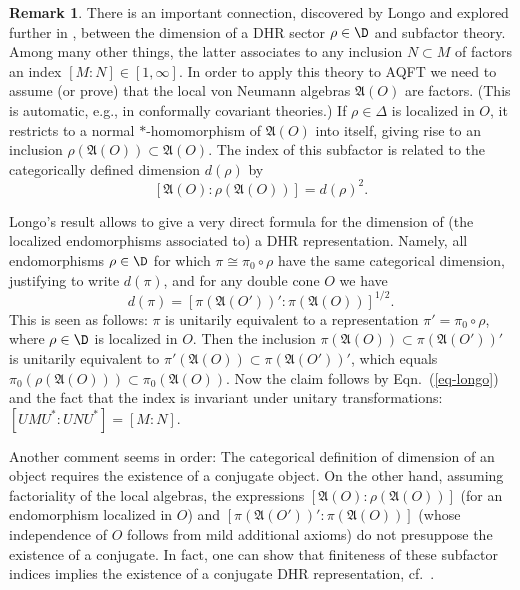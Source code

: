 \documentclass[11pt]{article}
\newcommand{\alg}[1]{\mathfrak{#1}}
\theoremstyle{definition}
\theoremstyle{definition}
\newtheorem{note}[thm]{Remark}
\theoremstyle{remark}
\begin{document}
\begin{note} \label{note-longo}
There is an important connection, discovered by Longo \cite{longo} and explored further in
\cite{LR},  between the dimension of a DHR sector $\rho\in\D$ and subfactor theory. Among many other
things, the latter associates  to any inclusion $N\subset M$ of factors an index
$[M:N]\in[1,\infty]$. In order to apply this theory to AQFT we need  to assume (or prove) that the
local von Neumann algebras $\alg{A}(O)$ are factors. (This is automatic, e.g., in conformally
covariant theories.) If $\rho\in\Delta$ is localized in $O$, it restricts to a normal
$*$-homomorphism  of $\alg{A}(O)$ into itself, giving rise to an inclusion
$\rho(\alg{A}(O))\subset\alg{A}(O)$. The index of this subfactor is related to the categorically
defined dimension $d(\rho)$ by  
\begin{equation}\label{eq-longo} [\alg{A}(O):\rho(\alg{A}(O))]=d(\rho)^2. \end{equation} 

Longo's result allows to give a very direct formula for the dimension of (the localized
endomorphisms associated to) a DHR representation. Namely, all endomorphisms $\rho\in\D$ for which
$\pi\cong\pi_0\circ\rho$ have the same categorical dimension, justifying to write $d(\pi)$, and for
any double cone $O$ we have 
\[ d(\pi)=[\pi(\alg{A}(O'))':\pi(\alg{A}(O))]^{1/2}. \]
This is seen as follows: $\pi$ is unitarily equivalent
to a representation $\pi'=\pi_0\circ\rho$, where
$\rho\in\D$ is localized in $O$. Then the inclusion
$\pi(\alg{A}(O))\subset\pi(\alg{A}(O'))'$ is unitarily
equivalent to
$\pi'(\alg{A}(O))\subset\pi(\alg{A}(O'))'$, which
equals
$\pi_0(\rho(\alg{A}(O)))\subset\pi_0(\alg{A}(O))$. Now
the claim follows by Eqn.\ (\ref{eq-longo}) and the
fact that the index is invariant under unitary
transformations: $[UMU^*:UNU^*]=[M:N]$.

Another comment seems in order: The categorical
definition of dimension of an object requires the
existence of a conjugate object. On the other hand,
assuming factoriality of the local algebras, the
expressions $[\alg{A}(O):\rho(\alg{A}(O))]$ (for an
endomorphism localized in $O$) and
$[\pi(\alg{A}(O'))':\pi(\alg{A}(O))]$ (whose
independence of $O$ follows from mild additional
axioms) do not presuppose the existence of a
conjugate. In fact, one can show that finiteness of
these subfactor indices implies the existence of a
conjugate DHR representation, cf.\ \cite{guido-longo}.
\end{note}
\end{document}
